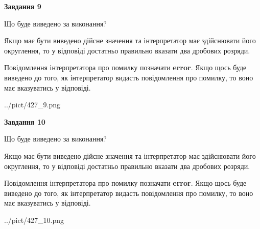 \documentclass[12pt, ukrainian]{article}
\begin{document}
{\begin {Large}
{\begin {center}\textbf{Завдання 9}\end {center}}\par
Що буде виведено за виконання? \par

Якщо має бути виведено дійсне значення та інтерпретатор має здійснювати його округлення, 
то у відповіді достатньо правильно вказати два дробових розряди.

Повідомлення інтерпретатора про помилку позначати \textbf{error}.
Якщо щось буде виведено до того, як інтерпретатор видасть повідомлення про помилку, 
то воно має вказуватись у відповіді. \par

\begin{center}
	{../pict/427_9.png}
\end{center}
\newpage

{\begin {center}\textbf{Завдання 10}\end {center}}\par
Що буде виведено за виконання? \par

Якщо має бути виведено дійсне значення та інтерпретатор має здійснювати його округлення, 
то у відповіді достатньо правильно вказати два дробових розряди.

Повідомлення інтерпретатора про помилку позначати \textbf{error}.
Якщо щось буде виведено до того, як інтерпретатор видасть повідомлення про помилку, 
то воно має вказуватись у відповіді. \par

\begin{center}
	{../pict/427_10.png}
\end{center}
\newpage

\end {Large}}
\end{document}
